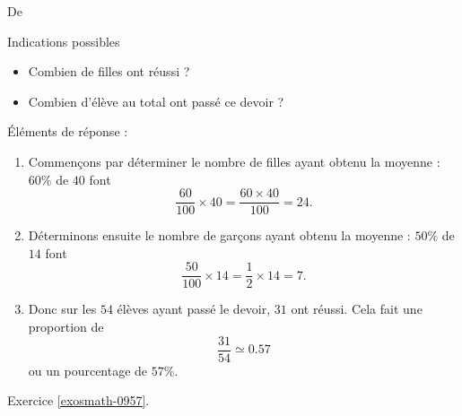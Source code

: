 
De \cite{NRHooXFvgpp4}

Indications possibles
\begin{itemize}
    \item Combien de filles ont réussi ?
    \item Combien d'élève au total ont passé ce devoir ?
\end{itemize}

Éléments de réponse :
\begin{enumerate}
    \item
        Commençons par déterminer le nombre de filles ayant obtenu la moyenne : \( 60\%\) de \( 40\) font
        \begin{equation}
            \frac{ 60 }{ 100 }\times 40=\frac{ 60\times 40 }{ 100 }=24.
        \end{equation}
    \item
        Déterminons ensuite le nombre de garçons ayant obtenu la moyenne : \( 50\%\) de \( 14\) font
        \begin{equation}
            \frac{ 50 }{ 100 }\times 14=\frac{ 1 }{2}\times 14=7.
        \end{equation}
    \item
        Donc sur les \( 54\) élèves ayant passé le devoir, \( 31\) ont réussi. Cela fait une proportion de
        \begin{equation}
            \frac{ 31 }{ 54 }\simeq 0.57
        \end{equation}
        ou un pourcentage de \( 57\%\).
\end{enumerate}

Exercice \ref{exosmath-0957}.
